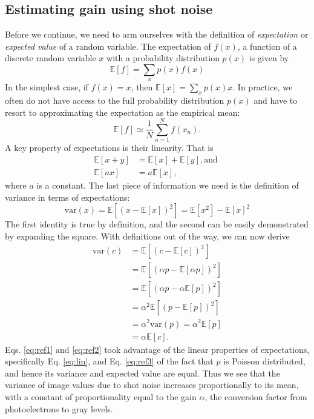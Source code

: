 \documentclass[a4paper]{report}
\begin{document}
\section{}
\subsection{Estimating gain using shot noise}
Before we continue, we need to arm ourselves with the definition of \textit{expectation} or \textit{expected value} of a random variable. 
The expectation of $f(x)$, a function of a discrete random variable $x$ with a probability distribution $p(x)$ is given by
\begin{equation}
\mathbb {E} [f] = \sum _{x} p(x) f(x)
\end{equation}
In the simplest case, if $f(x) = x$, then $\mathbb {E} [x] = \sum _{x} p(x) x$. 
In practice, we often do not have access to the full probability distribution $p(x)$ and have to resort to approximating the expectation as the empirical mean:
\begin{equation}
\mathbb { E } [ f ] \simeq \frac { 1 } { N } \sum _ { n = 1 } ^ { N } f \left( x _ { n } \right).
\end{equation}
A key property of expectations is their linearity. That is
\begin{align}
\mathbb{E}[x+y] &= \mathbb{E}[x] + \mathbb{E}[y], \textrm{and } \\
\mathbb{E}[ax] & = a \mathbb{E}[x], \label{eq:lin}
\end{align}
where $a$ is a constant. The last piece of information we need is the definition of variance in terms of expectations:
\begin{equation}
	\mathrm{var}(x) = \mathbb{E}[(x - \mathbb{E}[x])^2] = \mathbb{E}[x^2] - \mathbb{E}[x]^2
\end{equation}
The first identity is true by definition, and the second can be easily demonstrated by expanding the square. With definitions out of the way, we can now derive 
\begin{align}
	\mathrm{var}(c) & = \mathbb{E}[(c - \mathbb{E}[c])^2] \\
	& = \mathbb{E}[(\alpha p - \mathbb{E}[\alpha p])^2] \\ 
	& = \mathbb{E}[(\alpha p - \alpha \mathbb{E}[p] )^2] \label{eq:ref1} \\ 
	& = \alpha^2 \mathbb{E}[(p - \mathbb{E}[p])^2] \label{eq:ref2} \\ 
	& = \alpha^2 \mathrm{var}(p) = \alpha^2 \mathbb{E}[p] \label{eq:ref3} \\
	& = \alpha\mathbb{E}[c].
\end{align}
Eqs. \ref{eq:ref1} and \ref{eq:ref2} took advantage of the linear properties of expectations, specifically Eq. \ref{eq:lin}, and Eq. \ref{eq:ref3} of the fact that $p$ is Poisson distributed, and hence its variance and expected value are equal. Thus we see that the variance of image values due to shot noise increases proportionally to its mean, with a constant of proportionality equal to the gain $\alpha$, the conversion factor from photoelectrons to gray levels.
\end{document}
